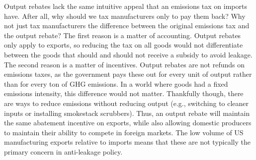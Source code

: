 Output rebates lack the same intuitive appeal that an emissions tax on imports have. After all, why should we tax manufacturers only to pay them back? Why not just tax manufacturers the difference between the original emissions tax and the output rebate? The first reason is a matter of accounting. Output rebates only apply to exports, so reducing the tax on all goods would not differentiate between the goods that should and should not receive a subsidy to avoid leakage. The second reason is a matter of incentives. Output rebates are not refunds on emissions taxes, as the government pays these out for every unit of output rather than for every ton of GHG emissions. In a world where goods had a fixed emissions intensity, this difference would not matter. Thankfully though, there are ways to reduce emissions without reducing output (e.g., switching to cleaner inputs or installing smokestack scrubbers). Thus, an output rebate will maintain the same abatement incentive on exports, while also allowing domestic producers to maintain their ability to compete in foreign markets. The low volume of US manufacturing exports relative to imports means that these are not typically the primary concern in anti-leakage policy.

